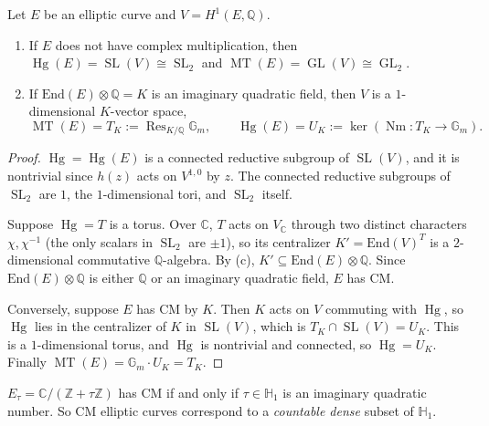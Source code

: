 \documentclass[12pt]{amsart}
\newcommand{\Q}{\mathbb{Q}}
\newcommand{\C}{\mathbb{C}}
\newcommand{\Z}{\mathbb{Z}}
\newcommand{\Gm}{\mathbb{G}_m}
\newcommand{\End}{\text{End}}
\DeclareMathOperator{\GL}{GL}
\DeclareMathOperator{\SL}{SL}
\DeclareMathOperator{\MT}{MT}
\DeclareMathOperator{\Hg}{Hg}
\DeclareMathOperator{\Res}{Res}
\DeclareMathOperator{\Nm}{Nm}
\newcommand{\HH}{\mathbb{H}}
\theoremstyle{definition}
\theoremstyle{remark}
\numberwithin{equation}{section}
\begin{document}
\begin{proposition}\label{prop:elliptic}
    Let $E$ be an elliptic curve and $V = H^1(E, \Q)$.
    \begin{enumerate}[label=(\roman*)]
        \item If $E$ does not have complex multiplication, then
        $\Hg(E) = \SL(V) \cong \SL_2$ and $\MT(E) = \GL(V) \cong \GL_2$.
        \item If $\End(E) \otimes \Q = K$ is an imaginary quadratic field, then
        $V$ is a $1$-dimensional $K$-vector space,
        \begin{equation*}
            \MT(E) = T_K := \Res_{K/\Q} \Gm, \qquad
            \Hg(E) = U_K := \ker\left(\Nm \colon T_K \to \Gm\right).
        \end{equation*}
    \end{enumerate}
\end{proposition}
\begin{proof}
    $\Hg = \Hg(E)$ is a connected reductive subgroup of $\SL(V)$, and it is
    nontrivial since $h(z)$ acts on $V^{1,0}$ by $z$. The connected reductive
    subgroups of $\SL_2$ are $1$, the $1$-dimensional tori, and $\SL_2$
    itself.

    Suppose $\Hg = T$ is a torus. Over $\C$, $T$ acts on $V_\C$ through two
    distinct characters $\chi, \chi^{-1}$ (the only scalars in $\SL_2$ are
    $\pm 1$), so its centralizer $K' = \End(V)^T$ is a $2$-dimensional
    commutative $\Q$-algebra. By (c),
    $K' \subseteq \End(E) \otimes \Q$. Since $\End(E) \otimes \Q$ is either
    $\Q$ or an imaginary quadratic field, $E$ has CM.

    Conversely, suppose $E$ has CM by $K$. Then $K$ acts on $V$ commuting with
    $\Hg$, so $\Hg$ lies in the centralizer of $K$ in $\SL(V)$, which is
    $T_K \cap \SL(V) = U_K$. This is a $1$-dimensional torus, and $\Hg$ is
    nontrivial and connected, so $\Hg = U_K$. Finally
    $\MT(E) = \Gm \cdot U_K = T_K$.
\end{proof}

\begin{remark}
    $E_\tau = \C/(\Z + \tau\Z)$ has CM if and only if $\tau \in \HH_1$ is an
    imaginary quadratic number. So CM elliptic curves correspond to a
    \emph{countable dense} subset of $\HH_1$.
\end{remark}
\end{document}
